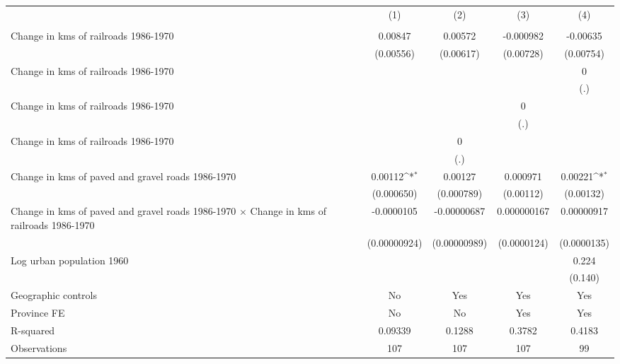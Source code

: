 {
\def\sym#1{\ifmmode^{#1}\else\(^{#1}\)\fi}
\begin{tabular}{l*{4}{c}}
\hline\hline
                &\multicolumn{1}{c}{(1)}&\multicolumn{1}{c}{(2)}&\multicolumn{1}{c}{(3)}&\multicolumn{1}{c}{(4)}\\
                &\multicolumn{1}{c}{}&\multicolumn{1}{c}{}&\multicolumn{1}{c}{}&\multicolumn{1}{c}{}\\
\hline
Change in kms of railroads 1986-1970&  0.00847         &  0.00572         &-0.000982         & -0.00635         \\
                &(0.00556)         &(0.00617)         &(0.00728)         &(0.00754)         \\
[1em]
Change in kms of railroads 1986-1970&                  &                  &                  &        0         \\
                &                  &                  &                  &      (.)         \\
[1em]
Change in kms of railroads 1986-1970&                  &                  &        0         &                  \\
                &                  &                  &      (.)         &                  \\
[1em]
Change in kms of railroads 1986-1970&                  &        0         &                  &                  \\
                &                  &      (.)         &                  &                  \\
[1em]
Change in kms of paved and gravel roads 1986-1970&  0.00112\sym{*}  &  0.00127         & 0.000971         &  0.00221\sym{*}  \\
                &(0.000650)         &(0.000789)         &(0.00112)         &(0.00132)         \\
[1em]
Change in kms of paved and gravel roads 1986-1970 $\times$ Change in kms of railroads 1986-1970&-0.0000105         &-0.00000687         &0.000000167         &0.00000917         \\
                &(0.00000924)         &(0.00000989)         &(0.0000124)         &(0.0000135)         \\
[1em]
Log urban population 1960&                  &                  &                  &    0.224         \\
                &                  &                  &                  &  (0.140)         \\
\hline
Geographic controls&       No         &      Yes         &      Yes         &      Yes         \\
Province FE     &       No         &       No         &      Yes         &      Yes         \\
R-squared       &  0.09339         &   0.1288         &   0.3782         &   0.4183         \\
Observations    &      107         &      107         &      107         &       99         \\
\hline\hline
\end{tabular}
}
